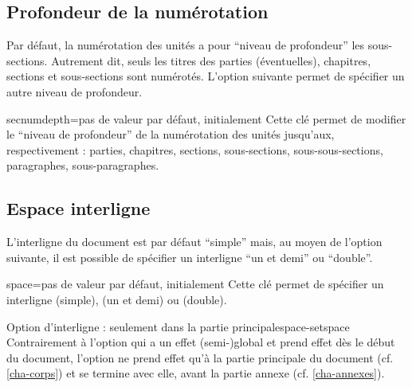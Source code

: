 \subsection{Profondeur de la numérotation}\label{sec-profondeur-de-la}
%
%

Par défaut, la numérotation des unités a pour \enquote{niveau de
  profondeur} les sous-sections. Autrement dit, seuls les titres des parties
(éventuelles), chapitres, sections et sous-sections sont numérotés.  L'option
 suivante permet de spécifier un autre niveau de
profondeur.
%
{%
  \begin{docKey}{secnumdepth}{=\textbar{}\textbar{}\textbar{}\textbar{}\textbar{}\textbar{}}{pas
      de valeur par défaut, initialement }
    Cette clé permet de modifier le \enquote{niveau de profondeur} de la
    numérotation des unités jusqu'aux, respectivement : parties,
    chapitres, sections, sous-sections, sous-sous-sections, paragraphes,
    sous-paragraphes.
  \end{docKey}
}

\subsection{Espace interligne}\label{sec-interligne}
%

L'interligne du document est par défaut \enquote{simple} mais, au moyen de
l'option  suivante, il est possible de spécifier un interligne
\enquote{un et demi} ou \enquote{double}.

\begin{docKey}{space}{=\textbar{}\textbar{}}{pas de valeur par défaut,
    initialement }
  Cette clé permet de spécifier un interligne  (simple),
   (un et demi) ou  (double).
\end{docKey}

\begin{dbwarning}{Option d'interligne : seulement dans la partie
    principale}{space-setspace}
  Contrairement à l'option  qui a un effet (semi-)global et
  prend effet dès le début du document, l'option  ne prend effet
  qu'à la partie principale du document (cf. \vref{cha-corps}) et se termine
  avec elle, avant la partie annexe (cf. \vref{cha-annexes}).
\end{dbwarning}

